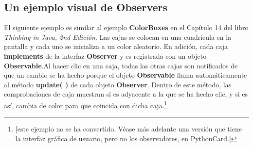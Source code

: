 \subsection*{Un ejemplo visual de Observers}
\label{subsec:uevdo}

El siguiente ejemplo es similar al ejemplo \textbf{ColorBoxes} en el Capítulo 14 del libro \textit{Thinking in Java, 2nd Edición}. Las cajas se colocan en una cuadrícula en la pantalla y cada uno se inicializa a un color aleatorio. 
En adición, cada caja \textbf{implements} de la interfaz \textbf{Observer} y es registrada con un objeto \textbf{Observable}.Al hacer clic en una caja, todas las otras cajas son notificados de que un cambio se ha hecho porque el objeto \textbf{Observable} llama automáticamente al método \textbf{update( )} de cada objeto \textbf{Observer}.  Dentro de este método, las comprobaciones de caja muestran si es adyacente a la que se ha hecho clic, y si es así, cambia de color para que coincida con dicha caja.\footnote{[este ejemplo no se ha convertido. Véase más adelante una versión que tiene la interfaz gráfica de usuario, pero no los observadores, en PythonCard.]}  \newline



